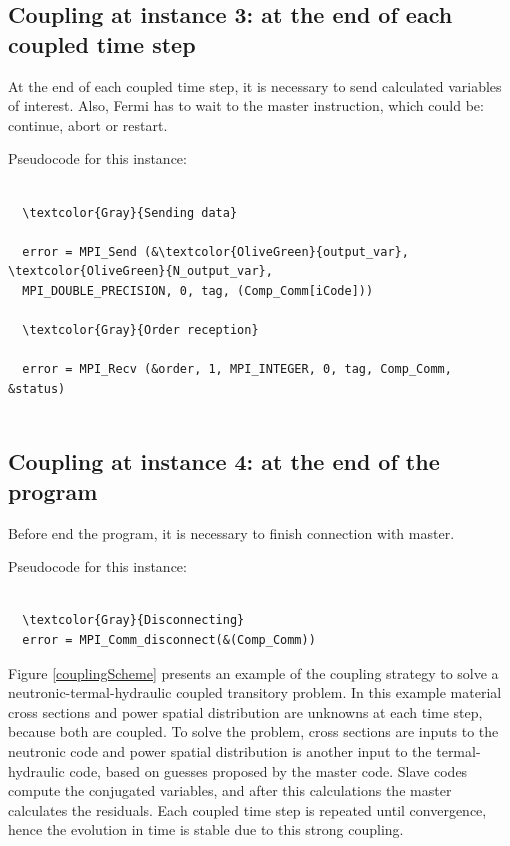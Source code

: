 \subsection*{Coupling at instance 3: at the end of each coupled time step}

At the end of each coupled time step, it is necessary to send calculated variables of interest.
Also, Fermi has to wait to the master instruction, which could be: continue, abort or restart.

Pseudocode for this instance:

\begin{Verbatim}[frame=single,commandchars=\\\{\}]

  \textcolor{Gray}{Sending data}

  error = MPI_Send (&\textcolor{OliveGreen}{output_var}, \textcolor{OliveGreen}{N_output_var},
  MPI_DOUBLE_PRECISION, 0, tag, (Comp_Comm[iCode]))

  \textcolor{Gray}{Order reception}

  error = MPI_Recv (&order, 1, MPI_INTEGER, 0, tag, Comp_Comm, &status)


\end{Verbatim}


\subsection*{Coupling at instance 4: at the end of the program}

Before end the program, it is necessary to finish connection with master.

Pseudocode for this instance:

\begin{Verbatim}[frame=single,commandchars=\\\{\}]

  \textcolor{Gray}{Disconnecting}
  error = MPI_Comm_disconnect(&(Comp_Comm))

\end{Verbatim}

Figure \ref{couplingScheme} presents an example of the coupling strategy to solve a neutronic-termal-hydraulic coupled transitory problem.
In this example material cross sections and power spatial distribution are unknowns at each time step, because both are coupled.
To solve the problem, cross sections are inputs to the neutronic code and power spatial distribution is another input to the termal-hydraulic code,
based on guesses proposed by the master code.
Slave codes compute the conjugated variables, and after this calculations the master calculates the residuals.
Each coupled time step is repeated until convergence, hence the evolution in time is stable due to this strong coupling.



